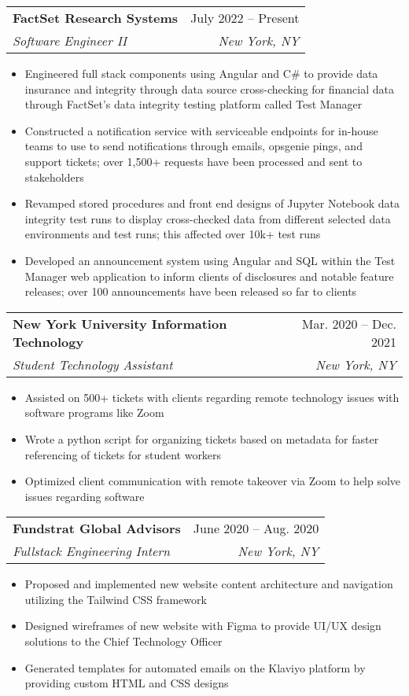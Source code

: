 \documentclass[letterpaper,11pt]{article}
\makeatletter
\newcommand{\resumeItem}[1]{
  \item\small{
    {#1 \vspace{-2pt}}
  }
}
\newcommand{\resumeSubheading}[4]{
  \vspace{-2pt}\item
    \begin{tabular*}{0.97\textwidth}[t]{l@{\extracolsep{\fill}}r}
      \textbf{#1} & #2 \\
      \textit{\small#3} & \textit{\small #4} \\
    \end{tabular*}\vspace{-7pt}
}
\newcommand{\resumeSubSubheading}[2]{
    \item
    \begin{tabular*}{0.97\textwidth}{l@{\extracolsep{\fill}}r}
      \textit{\small#1} & \textit{\small #2} \\
    \end{tabular*}\vspace{-7pt}
}
\newcommand{\resumeSubHeadingListEnd}{\end{itemize}}
\newcommand{\resumeItemListStart}{\begin{itemize}}
\newcommand{\resumeItemListEnd}{\end{itemize}\vspace{-5pt}}
\makeatother
\begin{document}
    \resumeSubheading
      {FactSet Research Systems}{July 2022 -- Present}
      {Software Engineer II}{New York, NY}
      \resumeItemListStart
        \resumeItem{Engineered full stack components using Angular and C\# to provide data
                    insurance and integrity through data source cross-checking for financial data through FactSet's data integrity testing platform called Test Manager}
        \resumeItem{Constructed a notification service with serviceable endpoints for in-house teams to use to send notifications through emails, opsgenie pings, and support tickets; over 1,500+ requests have been processed and sent to stakeholders}
        \resumeItem{Revamped stored procedures and front end designs of Jupyter Notebook data
integrity test runs to display cross-checked data from different selected data environments and test runs; this affected over 10k+ test runs}
        \resumeItem{Developed an announcement system using Angular and SQL within the Test Manager web application to inform clients of disclosures and notable feature releases; over 100 announcements have been released so far to clients}
        \resumeItemListEnd
      

    \resumeSubheading
      {New York University Information Technology}{Mar. 2020 -- Dec. 2021}
      {Student Technology Assistant}{New York, NY}
      \resumeItemListStart
        \resumeItem{Assisted on 500+ tickets with clients regarding remote technology issues
with software programs like Zoom}
        \resumeItem{ Wrote a python script for organizing tickets based on
metadata for faster referencing of tickets for student workers}
        \resumeItem{Optimized client communication with remote takeover via Zoom to help solve
issues regarding software}
    \resumeItemListEnd

    \resumeSubheading
      {Fundstrat Global Advisors}{June 2020 -- Aug. 2020}
      {Fullstack Engineering Intern}{New York, NY}
      \resumeItemListStart
        \resumeItem{Proposed and implemented new website content architecture and navigation utilizing the Tailwind CSS framework}
        \resumeItem{Designed wireframes of new website with Figma to provide UI/UX design solutions to the Chief Technology Officer}
        \resumeItem{Generated templates for automated emails on the Klaviyo platform by providing
custom HTML and CSS designs}
      \resumeItemListEnd
      
\end{document}
